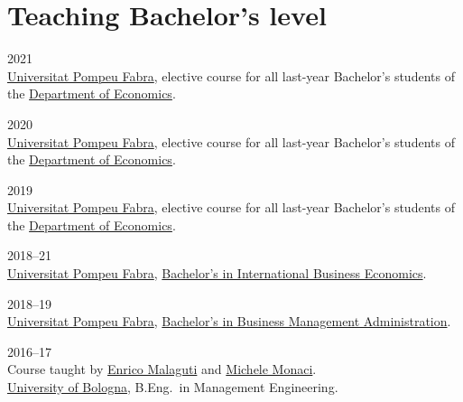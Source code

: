 \section*{Teaching \small{Bachelor's level}}

\begin{paracol}{2}
  2021
\switchcolumn
  \\
  \href{https://www.upf.edu/}{Universitat Pompeu Fabra}, elective course for all last-year Bachelor's students of the \href{https://www.upf.edu/web/econ/}{Department of Economics}.
\end{paracol}

\begin{paracol}{2}
  2020
\switchcolumn
  \\
  \href{https://www.upf.edu/}{Universitat Pompeu Fabra}, elective course for all last-year Bachelor's students of the \href{https://www.upf.edu/web/econ/}{Department of Economics}.
\end{paracol}

\begin{paracol}{2}
  2019
\switchcolumn
  \\
  \href{https://www.upf.edu/}{Universitat Pompeu Fabra}, elective course for all last-year Bachelor's students of the \href{https://www.upf.edu/web/econ/}{Department of Economics}.
\end{paracol}

\begin{paracol}{2}
  2018--21
\switchcolumn
  \\
  \href{https://www.upf.edu/}{Universitat Pompeu Fabra}, \href{https://www.upf.edu/es/web/graus/grau-international-business-economics}{Bachelor's in International Business Economics}.
\end{paracol}

\begin{paracol}{2}
  2018--19
\switchcolumn
  \\
  \href{https://www.upf.edu/}{Universitat Pompeu Fabra}, \href{https://www.upf.edu/es/web/graus/grau-ade}{Bachelor's in Business Management Administration}.
\end{paracol}

\begin{paracol}{2}
  2016--17
\switchcolumn
  \\
  Course taught by \href{https://scholar.google.com/citations?user=3nD4vYkAAAAJ}{Enrico Malaguti} and \href{https://scholar.google.com/citations?user=wORMYBMAAAAJ}{Michele Monaci}.\\
  \href{https://www.unibo.it}{University of Bologna}, B.Eng.\ in Management Engineering.
\end{paracol}